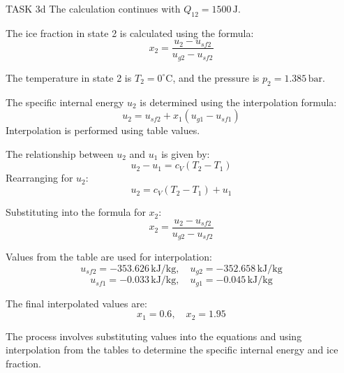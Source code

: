 TASK 3d  
The calculation continues with \( Q_{12} = 1500 \, \text{J} \).  

The ice fraction in state 2 is calculated using the formula:  
\[
x_2 = \frac{u_2 - u_{sf2}}{u_{g2} - u_{sf2}}
\]  

The temperature in state 2 is \( T_2 = 0^\circ\text{C} \), and the pressure is \( p_2 = 1.385 \, \text{bar} \).  

The specific internal energy \( u_2 \) is determined using the interpolation formula:  
\[
u_2 = u_{sf2} + x_1 (u_{g1} - u_{sf1})
\]  
Interpolation is performed using table values.  

The relationship between \( u_2 \) and \( u_1 \) is given by:  
\[
u_2 - u_1 = c_V (T_2 - T_1)
\]  
Rearranging for \( u_2 \):  
\[
u_2 = c_V (T_2 - T_1) + u_1
\]  

Substituting into the formula for \( x_2 \):  
\[
x_2 = \frac{u_2 - u_{sf2}}{u_{g2} - u_{sf2}}
\]  

Values from the table are used for interpolation:  
\[
u_{sf2} = -353.626 \, \text{kJ/kg}, \quad u_{g2} = -352.658 \, \text{kJ/kg}
\]  
\[
u_{sf1} = -0.033 \, \text{kJ/kg}, \quad u_{g1} = -0.045 \, \text{kJ/kg}
\]  

The final interpolated values are:  
\[
x_1 = 0.6, \quad x_2 = 1.95
\]  

The process involves substituting values into the equations and using interpolation from the tables to determine the specific internal energy and ice fraction.